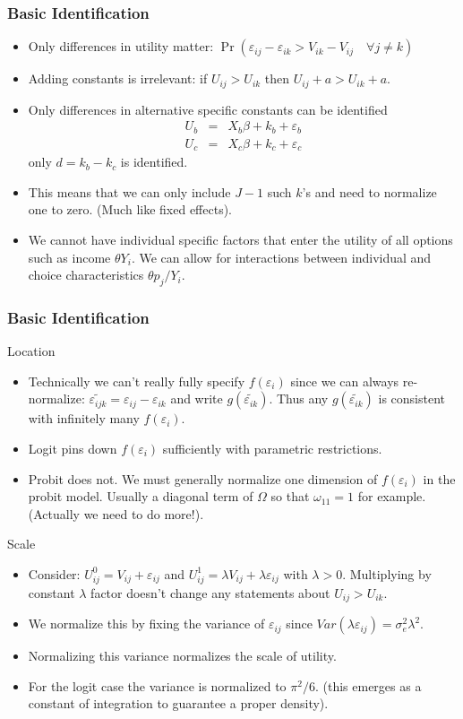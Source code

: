 \documentclass[aspectratio=169,11pt]{beamer}
\begin{document}
\begin{frame}
\frametitle{Basic Identification}
\small
\begin{itemize}
\item Only differences in utility matter: $\Pr( \varepsilon_{ij}-\varepsilon_{ik} > V_{ik} - V_{ij} \quad \forall j \neq k)$
\item Adding constants is irrelevant: if $U_{ij} > U_{ik}$ then $U_{ij} + a > U_{ik} + a$.
\item Only differences in alternative specific constants can be identified
\begin{eqnarray*}
U_b &=& X_b \beta + k_b  + \varepsilon_b\\
U_c &=& X_c \beta + k_c  + \varepsilon_c
\end{eqnarray*}
only $d = k_b - k_c$ is identified.
\item This means that we can only include $J-1$ such $k$'s and need to normalize one to zero. (Much like fixed effects).
\item We cannot have individual specific factors that enter the utility of all options such as income $\theta Y_i$. We can allow for interactions between individual and choice characteristics $\theta p_{j}/ Y_i$.
\end{itemize}
\end{frame}

\begin{frame}
\frametitle{Basic Identification}
Location
\begin{itemize}
\item Technically we can't really fully specify $f(\varepsilon_i)$ since we can always re-normalize: $\widetilde{\varepsilon_{ijk}} = \varepsilon_{ij} - \varepsilon_{ik}$ and write $g(\widetilde{\varepsilon_{ik}})$. Thus any $g(\widetilde{\varepsilon_{ik}})$ is consistent with infinitely many $f(\varepsilon_i)$.
\item Logit pins down $f(\varepsilon_i)$ sufficiently with parametric restrictions.
\item Probit does not. We must generally normalize one dimension of $f(\varepsilon_i)$ in the probit model. Usually a diagonal term of $\Omega$ so that $\omega_{11} =1$ for example. (Actually we need to do more!).
\end{itemize}
Scale
\begin{itemize}
\item Consider: $U_{ij}^0 = V_{ij} + \varepsilon_{ij}$ and  $U_{ij}^1 = \lambda V_{ij} + \lambda \varepsilon_{ij}$ with $\lambda > 0$. Multiplying by constant $\lambda$ factor doesn't change any statements about $U_{ij} > U_{ik}$.
\item We normalize this by fixing the variance of $\varepsilon_{ij}$ since $Var(\lambda \varepsilon_{ij} ) = \sigma_e^2 \lambda^2$.
\item Normalizing this variance normalizes the scale of utility.
\item For the logit case the variance is normalized to $\pi^2/6$. (this emerges as a constant of integration to guarantee a proper density).
\end{itemize}
\end{frame}
\end{document}
